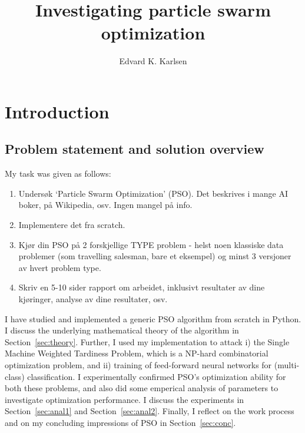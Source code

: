 \documentclass[a4paper,final,9pt]{article}
\title{Investigating particle swarm optimization}
\author{Edvard K. Karlsen}
\date {}
\begin{document}
\newcommand{\swarm}{\ensuremath{\mathcal{S}}}
\newcommand{\argmin}{\ensuremath{\text{argmin}}}
\newcommand{\argmax}{\ensuremath{\text{argmax}}}
\newcommand{\reals}{\ensuremath{\mathbb{R}}}
\newcommand{\vv}[1]{\ensuremath{\mathbf{#1}}}

\maketitle

\section{Introduction}

\subsection{Problem statement and solution overview}

My task was given as follows:
\begin{enumerate}
  \item Unders{\o}k `Particle Swarm Optimization' (PSO).  Det beskrives i
    mange AI b{o}ker, p{\aa} Wikipedia, osv.  Ingen mangel p{\aa} info.
  \item Implementere det fra scratch.
  \item Kj{\o}r din PSO p{\aa} 2 forskjellige TYPE problem - helst noen
    klassiske data problemer (som travelling            salesman, bare et
    eksempel) og minst 3 versjoner av hvert problem type.
  \item Skriv en 5-10 sider rapport om arbeidet, inklusivt resultater av dine
    kj{\o}ringer, analyse av dine resultater, osv.
\end{enumerate}

\noindent
I have studied and implemented a generic PSO algorithm from scratch in Python.
I discuss the underlying mathematical theory of the algorithm in
Section~\ref{sec:theory}. Further, I used my implementation to attack i) the
Single Machine Weighted Tardiness Problem, which is a NP-hard combinatorial
optimization problem, and ii) training of feed-forward neural networks for
(multi-class) classification. I experimentally confirmed PSO's optimization
ability for both these problems, and also did some emperical analysis of
parameters to investigate optimization performance.  I discuss the experiments
in Section~\ref{sec:anal1} and Section~\ref{sec:anal2}.  Finally, I reflect on the
work process and on my concluding impressions of PSO in
Section~\ref{sec:conc}.
\end{document}

